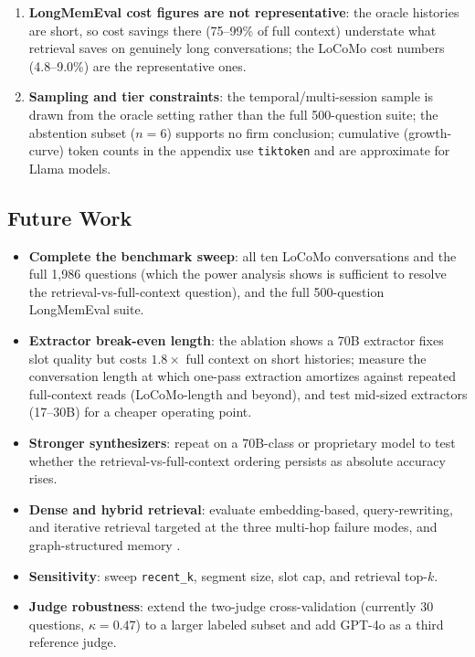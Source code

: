 \documentclass[conference]{IEEEtran}
\begin{document}
\begin{enumerate}
    \item \textbf{LongMemEval cost figures are not representative}: the oracle histories are short, so cost savings there (75--99\% of full context) understate what retrieval saves on genuinely long conversations; the LoCoMo cost numbers (4.8--9.0\%) are the representative ones.

    \item \textbf{Sampling and tier constraints}: the temporal/multi-session sample is drawn from the oracle setting rather than the full 500-question suite; the abstention subset ($n=6$) supports no firm conclusion; cumulative (growth-curve) token counts in the appendix use \texttt{tiktoken} and are approximate for Llama models.
\end{enumerate}

\subsection{Future Work}
\label{sec:future}

\begin{itemize}
    \item \textbf{Complete the benchmark sweep}: all ten LoCoMo conversations and the full 1{,}986 questions (which the power analysis shows is sufficient to resolve the retrieval-vs-full-context question), and the full 500-question LongMemEval suite.
    \item \textbf{Extractor break-even length}: the ablation shows a 70B extractor fixes slot quality but costs $1.8\times$ full context on short histories; measure the conversation length at which one-pass extraction amortizes against repeated full-context reads (LoCoMo-length and beyond), and test mid-sized extractors (17--30B) for a cheaper operating point.
    \item \textbf{Stronger synthesizers}: repeat on a 70B-class or proprietary model to test whether the retrieval-vs-full-context ordering persists as absolute accuracy rises.
    \item \textbf{Dense and hybrid retrieval}: evaluate embedding-based, query-rewriting, and iterative retrieval targeted at the three multi-hop failure modes, and graph-structured memory \cite{xu2025amem, chhikara2025mem0}.
    \item \textbf{Sensitivity}: sweep \texttt{recent\_k}, segment size, slot cap, and retrieval top-$k$.
    \item \textbf{Judge robustness}: extend the two-judge cross-validation (currently 30 questions, $\kappa=0.47$) to a larger labeled subset and add GPT-4o as a third reference judge.
\end{itemize}
\end{document}
